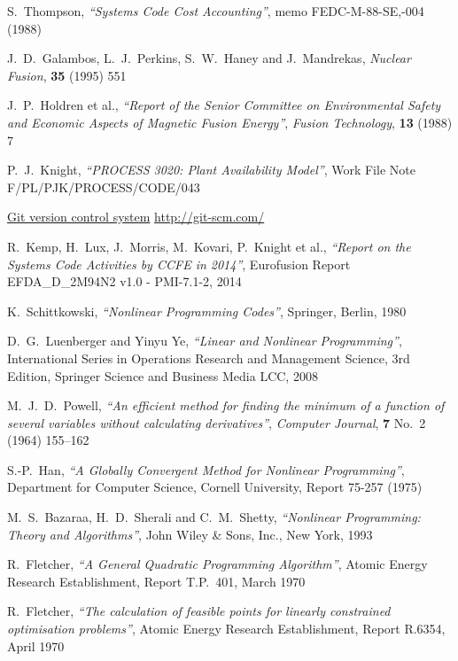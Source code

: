 \begin{thebibliography}{99}
S.\ Thompson,
\textit{``Systems Code Cost Accounting''},
memo FEDC-M-88-SE,-004 (1988)

J.\ D.\ Galambos, L.\ J.\ Perkins, S.\ W.\ Haney and J.\ Mandrekas,
\textit{Nuclear Fusion}, \textbf{35} (1995) 551

J.\ P.\ Holdren et al.,
\textit{``Report of the Senior Committee on Environmental Safety and
Economic Aspects of Magnetic Fusion Energy''},
\textit{Fusion Technology}, \textbf{13} (1988) 7

P.\ J.\ Knight,
\textit{``PROCESS 3020: Plant Availability Model''},
Work File Note F/PL/PJK/PROCESS/CODE/043

\href{http://git-scm.com/}{Git version control system}
\url{http://git-scm.com/}

R.\ Kemp, H.\ Lux, J.\ Morris, M.\ Kovari, P.\ Knight et al.,
\textit{``Report on the Systems Code Activities by CCFE in 2014''},
Eurofusion Report EFDA\_D\_2M94N2 v1.0 - PMI-7.1-2, 2014

K.\ Schittkowski,
\textit{``Nonlinear Programming Codes''},
Springer, Berlin, 1980

D.\ G.\ Luenberger and Yinyu Ye,
\textit{``Linear and Nonlinear Programming''},
International Series in Operations Research and Management Science, 3rd Edition,
Springer Science and Business Media LCC, 2008

M.\ J.\ D.\ Powell,
\textit{``An efficient method for finding the minimum of a function of several
  variables without calculating derivatives''}, 
\textit{Computer Journal}, \textbf{7} No.\ 2 (1964) 155--162

S.-P.\ Han,
\textit{``A Globally Convergent Method for Nonlinear Programming''},
Department for Computer Science, Cornell University, Report 75-257 (1975)

M.\ S.\ Bazaraa, H.\ D.\ Sherali and C.\ M.\ Shetty,
\textit{``Nonlinear Programming: Theory and Algorithms''},
John Wiley \& Sons, Inc., New York, 1993

R.\ Fletcher,
\textit{``A General Quadratic Programming Algorithm''},
Atomic Energy Research Establishment, Report T.P.~401, March 1970

R.\ Fletcher,
\textit{``The calculation of feasible points for linearly constrained
  optimisation problems''},
Atomic Energy Research Establishment, Report R.6354, April 1970


\end{thebibliography}
